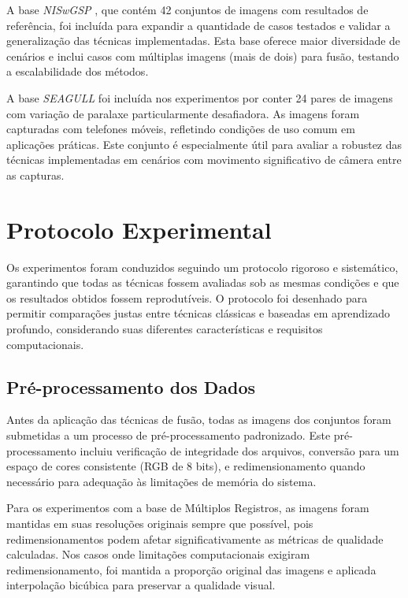 A base \textit{NISwGSP} \cite{chen2016natural}, que contém 42 conjuntos de imagens com resultados de referência, foi incluída para expandir a quantidade de casos testados e validar a generalização das técnicas implementadas. Esta base oferece maior diversidade de cenários e inclui casos com múltiplas imagens (mais de dois) para fusão, testando a escalabilidade dos métodos.

A base \textit{SEAGULL} \cite{lin2016seagull} foi incluída nos experimentos por conter 24 pares de imagens com variação de paralaxe particularmente desafiadora. As imagens foram capturadas com telefones móveis, refletindo condições de uso comum em aplicações práticas. Este conjunto é especialmente útil para avaliar a robustez das técnicas implementadas em cenários com movimento significativo de câmera entre as capturas.

\section{Protocolo Experimental}

Os experimentos foram conduzidos seguindo um protocolo rigoroso e sistemático, garantindo que todas as técnicas fossem avaliadas sob as mesmas condições e que os resultados obtidos fossem reprodutíveis. O protocolo foi desenhado para permitir comparações justas entre técnicas clássicas e baseadas em aprendizado profundo, considerando suas diferentes características e requisitos computacionais.

\subsection{Pré-processamento dos Dados}

Antes da aplicação das técnicas de fusão, todas as imagens dos conjuntos foram submetidas a um processo de pré-processamento padronizado. Este pré-processamento incluiu verificação de integridade dos arquivos, conversão para um espaço de cores consistente (RGB de 8 bits), e redimensionamento quando necessário para adequação às limitações de memória do sistema.

Para os experimentos com a base de Múltiplos Registros, as imagens foram mantidas em suas resoluções originais sempre que possível, pois redimensionamentos podem afetar significativamente as métricas de qualidade calculadas. Nos casos onde limitações computacionais exigiram redimensionamento, foi mantida a proporção original das imagens e aplicada interpolação bicúbica para preservar a qualidade visual.

